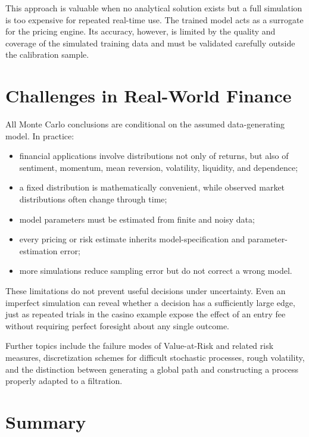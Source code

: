 \documentclass[12pt,openany]{book}
\theoremstyle{definition}
\theoremstyle{remark}
\begin{document}
This approach is valuable when no analytical solution exists but a full
simulation is too expensive for repeated real-time use. The trained model
acts as a surrogate for the pricing engine. Its accuracy, however, is limited
by the quality and coverage of the simulated training data and must be
validated carefully outside the calibration sample.

\section{Challenges in Real-World Finance}

All Monte Carlo conclusions are conditional on the assumed data-generating
model. In practice:
\begin{itemize}
    \item financial applications involve distributions not only of returns,
    but also of sentiment, momentum, mean reversion, volatility, liquidity,
    and dependence;
    \item a fixed distribution is mathematically convenient, while observed
    market distributions often change through time;
    \item model parameters must be estimated from finite and noisy data;
    \item every pricing or risk estimate inherits model-specification and
    parameter-estimation error;
    \item more simulations reduce sampling error but do not correct a wrong
    model.
\end{itemize}

These limitations do not prevent useful decisions under uncertainty. Even an
imperfect simulation can reveal whether a decision has a sufficiently large
edge, just as repeated trials in the casino example expose the effect of an
entry fee without requiring perfect foresight about any single outcome.

Further topics include the failure modes of Value-at-Risk and related risk
measures, discretization schemes for difficult stochastic processes, rough
volatility, and the distinction between generating a global path and
constructing a process properly adapted to a filtration.

\section{Summary}
\end{document}
